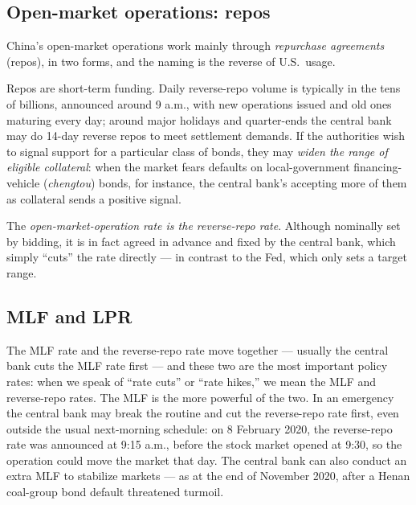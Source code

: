 \subsection{Open-market operations: repos}

China's open-market operations work mainly through \emph{repurchase agreements} (repos), in two forms, and the naming is the reverse of U.S.\ usage.


Repos are short-term funding. Daily reverse-repo volume is typically in the tens of billions, announced around 9 a.m., with new operations issued and old ones maturing every day; around major holidays and quarter-ends the central bank may do 14-day reverse repos to meet settlement demands. If the authorities wish to signal support for a particular class of bonds, they may \emph{widen the range of eligible collateral}: when the market fears defaults on local-government financing-vehicle (\emph{chengtou}) bonds, for instance, the central bank's accepting more of them as collateral sends a positive signal.

The \emph{open-market-operation rate is the reverse-repo rate}. Although nominally set by bidding, it is in fact agreed in advance and fixed by the central bank, which simply ``cuts'' the rate directly --- in contrast to the Fed, which only sets a target range.

\subsection{MLF and LPR}


The MLF rate and the reverse-repo rate move together --- usually the central bank cuts the MLF rate first --- and these two are the most important policy rates: when we speak of ``rate cuts'' or ``rate hikes,'' we mean the MLF and reverse-repo rates. The MLF is the more powerful of the two. In an emergency the central bank may break the routine and cut the reverse-repo rate first, even outside the usual next-morning schedule: on 8 February 2020, the reverse-repo rate was announced at 9:15 a.m., before the stock market opened at 9:30, so the operation could move the market that day. The central bank can also conduct an extra MLF to stabilize markets --- as at the end of November 2020, after a Henan coal-group bond default threatened turmoil.


